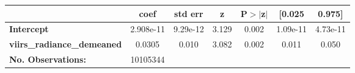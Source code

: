\begin{tabular}{lcccccc}
                                   & \textbf{coef} & \textbf{std err} & \textbf{z} & \textbf{P$> |$z$|$} & \textbf{[0.025} & \textbf{0.975]}  \\
\midrule
\textbf{Intercept}                 &    2.908e-11  &     9.29e-12     &     3.129  &         0.002        &     1.09e-11    &     4.73e-11     \\
\textbf{viirs\_radiance\_demeaned} &       0.0305  &        0.010     &     3.082  &         0.002        &        0.011    &        0.050     \\
\midrule
\textbf{No. Observations:}         &      10105344 & & & & & \\
\bottomrule
\end{tabular}